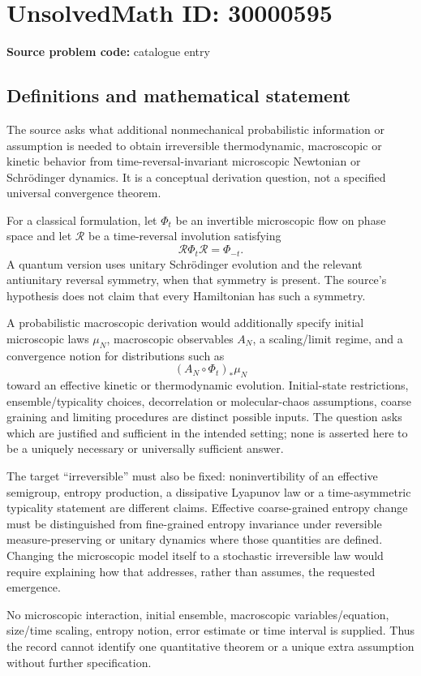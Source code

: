 \documentclass[11pt]{article}
\begin{document}
\section*{UnsolvedMath ID: 30000595}
\textbf{Source problem code:} catalogue entry
\subsection{Definitions and mathematical statement}
The source asks what additional nonmechanical probabilistic information or assumption is needed to obtain irreversible thermodynamic, macroscopic or kinetic behavior from time-reversal-invariant microscopic Newtonian or Schr\"odinger dynamics. It is a conceptual derivation question, not a specified universal convergence theorem.

For a classical formulation, let $\Phi_t$ be an invertible microscopic flow on phase space and let $\mathcal R$ be a time-reversal involution satisfying
\[
 \mathcal R\Phi_t\mathcal R=\Phi_{-t}.
\]
A quantum version uses unitary Schr\"odinger evolution and the relevant antiunitary reversal symmetry, when that symmetry is present. The source's hypothesis does not claim that every Hamiltonian has such a symmetry.

A probabilistic macroscopic derivation would additionally specify initial microscopic laws $\mu_N$, macroscopic observables $A_N$, a scaling/limit regime, and a convergence notion for distributions such as
\[
 (A_N\circ\Phi_t)_*\mu_N
\]
toward an effective kinetic or thermodynamic evolution. Initial-state restrictions, ensemble/typicality choices, decorrelation or molecular-chaos assumptions, coarse graining and limiting procedures are distinct possible inputs. The question asks which are justified and sufficient in the intended setting; none is asserted here to be a uniquely necessary or universally sufficient answer.

The target ``irreversible'' must also be fixed: noninvertibility of an effective semigroup, entropy production, a dissipative Lyapunov law or a time-asymmetric typicality statement are different claims. Effective coarse-grained entropy change must be distinguished from fine-grained entropy invariance under reversible measure-preserving or unitary dynamics where those quantities are defined. Changing the microscopic model itself to a stochastic irreversible law would require explaining how that addresses, rather than assumes, the requested emergence.

No microscopic interaction, initial ensemble, macroscopic variables/equation, size/time scaling, entropy notion, error estimate or time interval is supplied. Thus the record cannot identify one quantitative theorem or a unique extra assumption without further specification.
\end{document}
